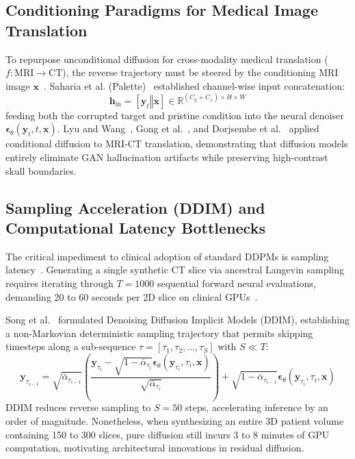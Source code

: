 \subsection{Conditioning Paradigms for Medical Image Translation}
To repurpose unconditional diffusion for cross-modality medical translation ($f: \text{MRI} \to \text{CT}$), the reverse trajectory must be steered by the conditioning MRI image $\mathbf{x}$~\cite{saharia2022palette,lyu2022conversion}. Saharia et al. (Palette)~\cite{saharia2022palette} established channel-wise input concatenation:
\begin{equation}
\mathbf{h}_{\text{in}} = [\mathbf{y}_t \mathbin{\Vert} \mathbf{x}] \in \mathbb{R}^{(C_y + C_x) \times H \times W}
\label{eq:palette_concat}
\end{equation}
feeding both the corrupted target and pristine condition into the neural denoiser $\boldsymbol{\epsilon}_\theta(\mathbf{y}_t, t, \mathbf{x})$. Lyu and Wang~\cite{lyu2022conversion}, Gong et al.~\cite{gong2023diffuse}, and Dorjsembe et al.~\cite{dorjsembe2024diffusion} applied conditional diffusion to MRI-CT translation, demonstrating that diffusion models entirely eliminate GAN hallucination artifacts while preserving high-contrast skull boundaries.

\subsection{Sampling Acceleration (DDIM) and Computational Latency Bottlenecks}
The critical impediment to clinical adoption of standard DDPMs is sampling latency~\cite{song2021denoising}. Generating a single synthetic CT slice via ancestral Langevin sampling requires iterating through $T = 1000$ sequential forward neural evaluations, demanding 20 to 60 seconds per 2D slice on clinical GPUs~\cite{song2021denoising,kazerouni2023diffusion}. 

Song et al.~\cite{song2021denoising} formulated Denoising Diffusion Implicit Models (DDIM), establishing a non-Markovian deterministic sampling trajectory that permits skipping timesteps along a sub-sequence $\tau = [\tau_1, \tau_2, \dots, \tau_S]$ with $S \ll T$:
\begin{equation}
\mathbf{y}_{\tau_{i-1}} = \sqrt{\bar{\alpha}_{\tau_{i-1}}} \left( \frac{\mathbf{y}_{\tau_i} - \sqrt{1 - \bar{\alpha}_{\tau_i}}\boldsymbol{\epsilon}_\theta(\mathbf{y}_{\tau_i}, \tau_i, \mathbf{x})}{\sqrt{\bar{\alpha}_{\tau_i}}} \right) + \sqrt{1 - \bar{\alpha}_{\tau_{i-1}}} \boldsymbol{\epsilon}_\theta(\mathbf{y}_{\tau_i}, \tau_i, \mathbf{x})
\label{eq:ddim_trajectory}
\end{equation}
DDIM reduces reverse sampling to $S = 50$ steps, accelerating inference by an order of magnitude. Nonetheless, when synthesizing an entire 3D patient volume containing 150 to 300 slices, pure diffusion still incurs 3 to 8 minutes of GPU computation, motivating architectural innovations in residual diffusion.

